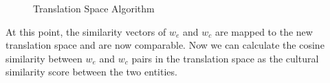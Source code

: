 \begin{figure}[]
\centering
{}
\caption{Translation Space Algorithm}
\label{fig:transspace}
\end{figure}

%

At this point, the similarity vectors of $w_e$ and $w_c$
are mapped to the new translation space and are now comparable.
Now we can calculate the cosine similarity between $w_e$ and $w_c$
pairs in the translation space as the cultural similarity score
between the two entities.

%
%
